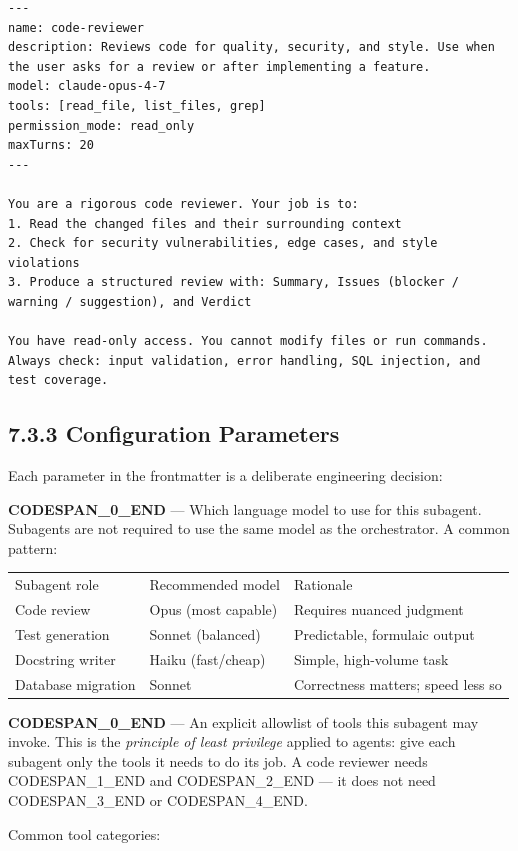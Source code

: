 \documentclass[11pt,a4paper]{book}
\begin{document}
\begin{lstlisting}
---
name: code-reviewer
description: Reviews code for quality, security, and style. Use when the user asks for a review or after implementing a feature.
model: claude-opus-4-7
tools: [read_file, list_files, grep]
permission_mode: read_only
maxTurns: 20
---

You are a rigorous code reviewer. Your job is to:
1. Read the changed files and their surrounding context
2. Check for security vulnerabilities, edge cases, and style violations
3. Produce a structured review with: Summary, Issues (blocker / warning / suggestion), and Verdict

You have read-only access. You cannot modify files or run commands.
Always check: input validation, error handling, SQL injection, and test coverage.
\end{lstlisting}

\subsection{7.3.3 Configuration Parameters}

Each parameter in the frontmatter is a deliberate engineering decision:

\textbf{CODESPAN\_0\_END} --- Which language model to use for this subagent. Subagents are not required to use the same model as the orchestrator. A common pattern:

\begin{tabular}{lll}
\hline
Subagent role & Recommended model & Rationale \\
Code review & Opus (most capable) & Requires nuanced judgment \\
Test generation & Sonnet (balanced) & Predictable, formulaic output \\
Docstring writer & Haiku (fast/cheap) & Simple, high-volume task \\
Database migration & Sonnet & Correctness matters; speed less so \\
\hline
\end{tabular}

\textbf{CODESPAN\_0\_END} --- An explicit allowlist of tools this subagent may invoke. This is the \textit{principle of least privilege} applied to agents: give each subagent only the tools it needs to do its job. A code reviewer needs CODESPAN\_1\_END and CODESPAN\_2\_END --- it does not need CODESPAN\_3\_END or CODESPAN\_4\_END.

Common tool categories:
\end{document}

